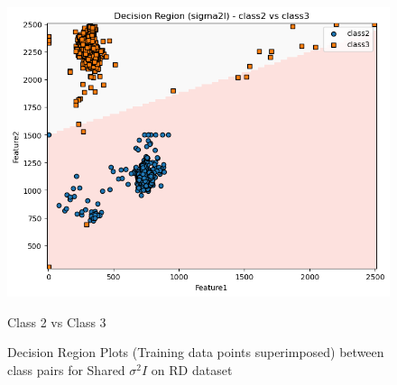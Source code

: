 \begin{figure}[H]
\begin{minipage}{0.32\linewidth}
        \includegraphics[width=\linewidth]{images/RD_Group04_images/01_sigma2i/04_decision_region_c2_c3.png}
        \caption*{Class 2 vs Class 3}
    \end{minipage}
    \caption{Decision Region Plots (Training data points superimposed) between class pairs for Shared $\sigma^2 I$ on RD dataset}
\end{figure}